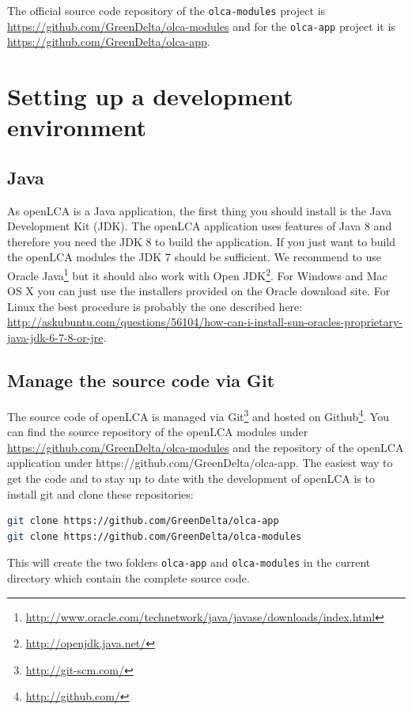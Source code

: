\documentclass{scrreprt}
\begin{document}
The official source code repository of the \texttt{olca-modules} project is \url{https://github.com/GreenDelta/olca-modules} and for the \texttt{olca-app} project it is \url{https://github.com/GreenDelta/olca-app}. 


\chapter{Setting up a development environment}

\section{Java}
As openLCA is a Java application, the first thing you should install is the Java Development Kit (JDK). The openLCA application uses features of Java 8 and therefore you need the JDK 8 to build the application. If you just want to build the openLCA modules the JDK 7 should be sufficient. We recommend to use Oracle Java\footnote{\url{http://www.oracle.com/technetwork/java/javase/downloads/index.html}} but it should also work with Open JDK\footnote{\url{http://openjdk.java.net/}}. For Windows and Mac OS X you can just use the installers provided on the Oracle download site. For Linux the best procedure is probably the one described here: \url{ http://askubuntu.com/questions/56104/how-can-i-install-sun-oracles-proprietary-java-jdk-6-7-8-or-jre}. 

\section{Manage the source code via Git}
The source code of openLCA is managed via Git\footnote{\url{http://git-scm.com/}} and hosted on Github\footnote{\url{http://github.com/}}. You can find the source repository of the openLCA modules under \url{https://github.com/GreenDelta/olca-modules} and the repository of the openLCA application under https://github.com/GreenDelta/olca-app. The easiest way to get the code and to stay up to date with the development of openLCA is to install git and clone these repositories:

\begin{lstlisting}[language=bash]
git clone https://github.com/GreenDelta/olca-app
git clone https://github.com/GreenDelta/olca-modules
\end{lstlisting} 

This will create the two folders \texttt{olca-app} and \texttt{olca-modules} in the current directory which contain the complete source code.
\end{document}
